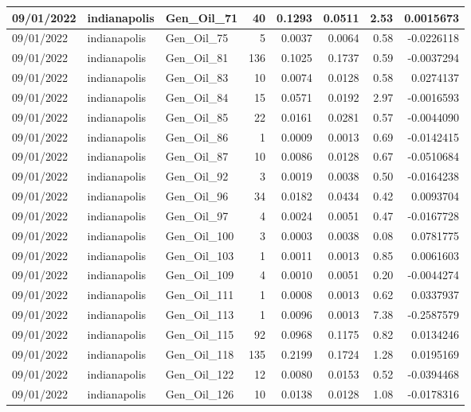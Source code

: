 \documentclass[
  letterpaper,
  DIV=11,
  numbers=noendperiod]{scrartcl}
\begin{document}
\begin{tabular}{l|l|l|r|r|r|r|r}
\hline
09/01/2022 & indianapolis & Gen\_Oil\_71 & 40 & 0.1293 & 0.0511 & 2.53 & 0.0015673\\
\hline
09/01/2022 & indianapolis & Gen\_Oil\_75 & 5 & 0.0037 & 0.0064 & 0.58 & -0.0226118\\
\hline
09/01/2022 & indianapolis & Gen\_Oil\_81 & 136 & 0.1025 & 0.1737 & 0.59 & -0.0037294\\
\hline
09/01/2022 & indianapolis & Gen\_Oil\_83 & 10 & 0.0074 & 0.0128 & 0.58 & 0.0274137\\
\hline
09/01/2022 & indianapolis & Gen\_Oil\_84 & 15 & 0.0571 & 0.0192 & 2.97 & -0.0016593\\
\hline
09/01/2022 & indianapolis & Gen\_Oil\_85 & 22 & 0.0161 & 0.0281 & 0.57 & -0.0044090\\
\hline
09/01/2022 & indianapolis & Gen\_Oil\_86 & 1 & 0.0009 & 0.0013 & 0.69 & -0.0142415\\
\hline
09/01/2022 & indianapolis & Gen\_Oil\_87 & 10 & 0.0086 & 0.0128 & 0.67 & -0.0510684\\
\hline
09/01/2022 & indianapolis & Gen\_Oil\_92 & 3 & 0.0019 & 0.0038 & 0.50 & -0.0164238\\
\hline
09/01/2022 & indianapolis & Gen\_Oil\_96 & 34 & 0.0182 & 0.0434 & 0.42 & 0.0093704\\
\hline
09/01/2022 & indianapolis & Gen\_Oil\_97 & 4 & 0.0024 & 0.0051 & 0.47 & -0.0167728\\
\hline
09/01/2022 & indianapolis & Gen\_Oil\_100 & 3 & 0.0003 & 0.0038 & 0.08 & 0.0781775\\
\hline
09/01/2022 & indianapolis & Gen\_Oil\_103 & 1 & 0.0011 & 0.0013 & 0.85 & 0.0061603\\
\hline
09/01/2022 & indianapolis & Gen\_Oil\_109 & 4 & 0.0010 & 0.0051 & 0.20 & -0.0044274\\
\hline
09/01/2022 & indianapolis & Gen\_Oil\_111 & 1 & 0.0008 & 0.0013 & 0.62 & 0.0337937\\
\hline
09/01/2022 & indianapolis & Gen\_Oil\_113 & 1 & 0.0096 & 0.0013 & 7.38 & -0.2587579\\
\hline
09/01/2022 & indianapolis & Gen\_Oil\_115 & 92 & 0.0968 & 0.1175 & 0.82 & 0.0134246\\
\hline
09/01/2022 & indianapolis & Gen\_Oil\_118 & 135 & 0.2199 & 0.1724 & 1.28 & 0.0195169\\
\hline
09/01/2022 & indianapolis & Gen\_Oil\_122 & 12 & 0.0080 & 0.0153 & 0.52 & -0.0394468\\
\hline
09/01/2022 & indianapolis & Gen\_Oil\_126 & 10 & 0.0138 & 0.0128 & 1.08 & -0.0178316\\

\end{tabular}
\end{document}
